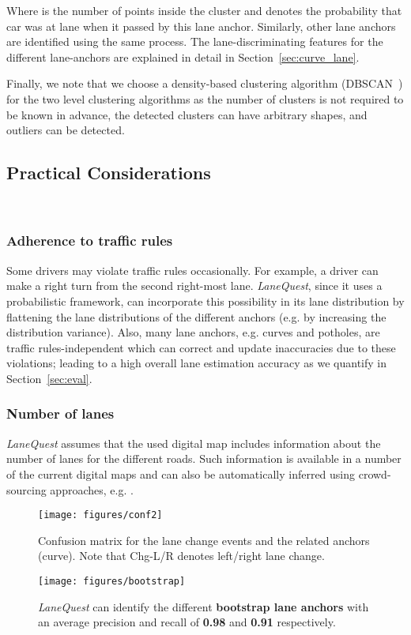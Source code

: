 \documentclass[10pt, conference, compsocconf]{IEEEtran}
\def \sys {\textit{LaneQuest}}
\newcommand{\figscale}{0.7}
\begin{document}
Where  is the number of points inside the cluster and  denotes the probability that car  was at lane  when it passed by this lane anchor. Similarly, other lane anchors are identified using the same process. The lane-discriminating features for the different lane-anchors are explained in detail in Section~\ref{sec:curve_lane}.

Finally, we note that we choose a density-based clustering algorithm (DBSCAN~\cite{ester1996density}) for the two level clustering algorithms as the number of clusters is not required to be known in advance, the detected clusters can have arbitrary shapes, and outliers can be detected. 
\subsection{Practical Considerations}~\label{sec:discuss}
\subsubsection{Adherence to traffic rules}
Some drivers may violate traffic rules occasionally. For example, a driver can make a right turn from the second right-most lane. \sys{}, since it uses a probabilistic framework, can incorporate this possibility in its lane distribution by flattening the lane distributions of the different anchors (e.g. by increasing the distribution variance). Also, many lane anchors, e.g. curves and potholes, are traffic rules-independent which can correct and update inaccuracies due to these violations; leading to a high overall lane estimation accuracy as we quantify in Section~\ref{sec:eval}.
\subsubsection{Number of lanes}
\sys{} assumes that the used digital map includes information about the number of lanes for the different roads. Such information is available in a number of the current digital maps  and can also be automatically inferred using crowd-sourcing approaches, e.g. \cite{chen2010probabilistic}.
\begin{figure}[!t]
\centering
\texttt{[image: figures/conf2]}
\caption{Confusion matrix for the lane change events and the related anchors (curve).   Note that Chg-L/R denotes left/right lane change.}
\label{fig:dyn_conf}
\end{figure}
 \begin{figure}[!t]
\centering
\texttt{[image: figures/bootstrap]}
\caption{\sys{} can identify the different \textbf{bootstrap lane anchors} with an average precision and recall of \textbf{0.98} and \textbf{0.91} respectively.}
\label{fig:anchor_det_boot}
\end{figure}
\end{document}
